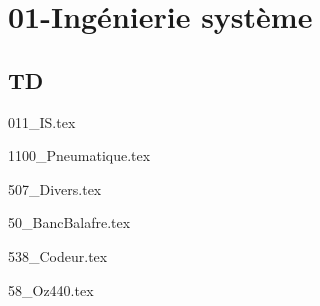 \clearpage
\chapter{01-Ingénierie système}

\section{TD}

\setcounter{question}{0}
{}
\graphicspath{{../01-Ingénierie système/TD/011_IS/images/}{../01-Ingénierie système/TD/011_IS/}{../Style/png/}}
{011_IS.tex}

\setcounter{question}{0}
{}
\graphicspath{{../01-Ingénierie système/TD/1100_Pneumatique/images/}{../01-Ingénierie système/TD/1100_Pneumatique/}{../Style/png/}}
{1100_Pneumatique.tex}

\setcounter{question}{0}
{}
\graphicspath{{../01-Ingénierie système/TD/507_Divers/images/}{../01-Ingénierie système/TD/507_Divers/}{../Style/png/}}
{507_Divers.tex}

\setcounter{question}{0}
{}
\graphicspath{{../01-Ingénierie système/TD/50_BancBalafre/images/}{../01-Ingénierie système/TD/50_BancBalafre/}{../Style/png/}}
{50_BancBalafre.tex}

\setcounter{question}{0}
{}
\graphicspath{{../01-Ingénierie système/TD/538_Codeur/images/}{../01-Ingénierie système/TD/538_Codeur/}{../Style/png/}}
{538_Codeur.tex}

\setcounter{question}{0}
{}
\graphicspath{{../01-Ingénierie système/TD/58_Oz440/images/}{../01-Ingénierie système/TD/58_Oz440/}{../Style/png/}}
{58_Oz440.tex}

